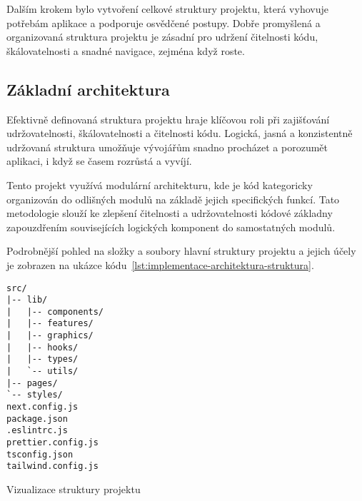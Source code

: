 Dalším krokem bylo vytvoření celkové struktury projektu, která vyhovuje potřebám aplikace a podporuje osvědčené postupy.
Dobře promyšlená a organizovaná struktura projektu je zásadní pro udržení čitelnosti kódu, škálovatelnosti a snadné navigace, zejména když  roste.

\subsection{Základní architektura}
\label{subsec:implementace-architektura-zakladni}
Efektivně definovaná struktura projektu hraje klíčovou roli při zajišťování udržovatelnosti, škálovatelnosti a čitelnosti kódu.
Logická, jasná a konzistentně udržovaná struktura umožňuje vývojářům snadno procházet a porozumět aplikaci, i když se  časem rozrůstá a vyvíjí.

Tento projekt využívá modulární architekturu, kde je kód kategoricky organizován do odlišných modulů na základě jejich specifických funkcí.
Tato metodologie slouží ke zlepšení čitelnosti a udržovatelnosti kódové základny zapouzdřením souvisejících logických komponent do samostatných modulů\cite{p_article_react_folder_structure}.

Podrobnější pohled na složky a soubory hlavní struktury projektu a jejich účely je zobrazen na ukázce kódu~\ref{lst:implementace-architektura-struktura}.

\begin{listing}[H]
\begin{verbatim}
src/
|-- lib/
|   |-- components/
|   |-- features/
|   |-- graphics/
|   |-- hooks/
|   |-- types/
|   `-- utils/
|-- pages/
`-- styles/
next.config.js
package.json
.eslintrc.js
prettier.config.js
tsconfig.json
tailwind.config.js
\end{verbatim}
\caption{Vizualizace struktury projektu}
\label{lst:implementace-architektura-struktura}
\end{listing}

